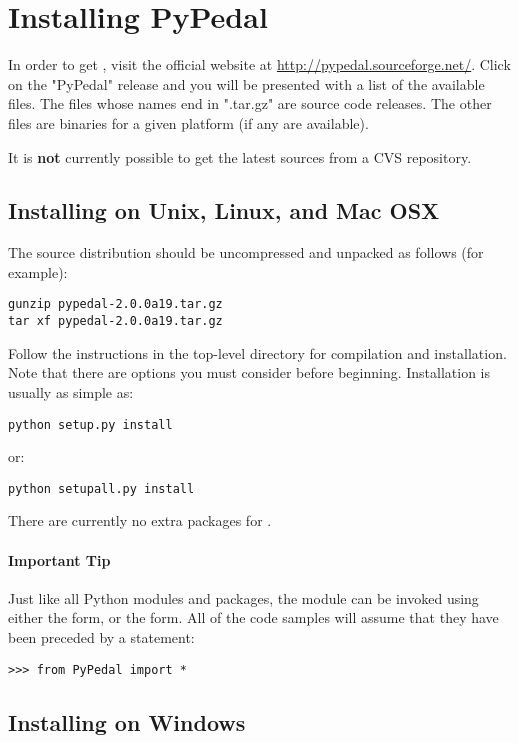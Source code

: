 \section{Installing PyPedal}
\label{sec:installing-pypedal}

In order to get \PYPEDAL{}, visit the official website at \url{http://pypedal.sourceforge.net/}.  Click on the "PyPedal" release and you will be presented with a list of the available files. The files whose names end in ".tar.gz" are source code releases. The other files are binaries for a given platform (if any are available).

It is \textbf{not} currently possible to get the latest sources from a CVS repository.

\subsection{Installing on Unix, Linux, and Mac OSX}
\label{sec:installing-unix}

The source distribution should be uncompressed and unpacked as follows (for
example):
\begin{verbatim}
gunzip pypedal-2.0.0a19.tar.gz
tar xf pypedal-2.0.0a19.tar.gz
\end{verbatim}
Follow the instructions in the top-level directory for compilation and installation. Note that there are options you must consider before beginning.  Installation is usually as simple as:
\begin{verbatim}
python setup.py install
\end{verbatim}
or:
\begin{verbatim}
python setupall.py install
\end{verbatim}
There are currently no extra packages for \PYPEDAL{}.

\paragraph*{Important Tip} \label{sec:tip:from-pypedal-import} Just like all Python modules and packages, the \PYPEDAL{} module can be invoked using either the  form, or the  form.  All of the code samples will assume that they have been preceded by a statement:
\begin{verbatim}
>>> from PyPedal import *
\end{verbatim}

\subsection{Installing on Windows}
\label{sec:installing-windows}

